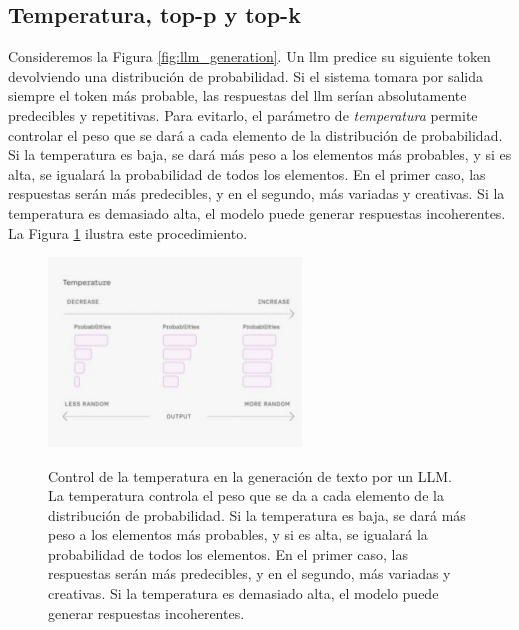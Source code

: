 \subsection{Temperatura, top-p y top-k}
\label{sec:hiperparametros_controlables}

Consideremos la Figura \ref{fig:llm_generation}. Un \gls{llm} predice su siguiente token devolviendo una distribución de probabilidad. Si el sistema tomara por salida siempre el token más probable, las respuestas del \gls{llm} serían absolutamente predecibles y repetitivas. Para evitarlo, el parámetro de \emph{temperatura} permite controlar el peso que se dará a cada elemento de la distribución de probabilidad. Si la temperatura es baja, se dará más peso a los elementos más probables, y si es alta, se igualará la probabilidad de todos los elementos. En el primer caso, las respuestas serán más predecibles, y en el segundo, más variadas y creativas. Si la temperatura es demasiado alta, el modelo puede generar respuestas incoherentes. La Figura \ref{fig:temperatura} ilustra este procedimiento.

\begin{figure}[H]
    \caption[Control de la temperatura en la generación de texto por un LLM]{Control de la temperatura en la generación de texto por un LLM. La temperatura controla el peso que se da a cada elemento de la distribución de probabilidad. Si la temperatura es baja, se dará más peso a los elementos más probables, y si es alta, se igualará la probabilidad de todos los elementos. En el primer caso, las respuestas serán más predecibles, y en el segundo, más variadas y creativas. Si la temperatura es demasiado alta, el modelo puede generar respuestas incoherentes.}
    \centering
    \includegraphics[width=0.6\textwidth]{./figuras/temperatura.png}
    \label{fig:temperatura}
\end{figure}

